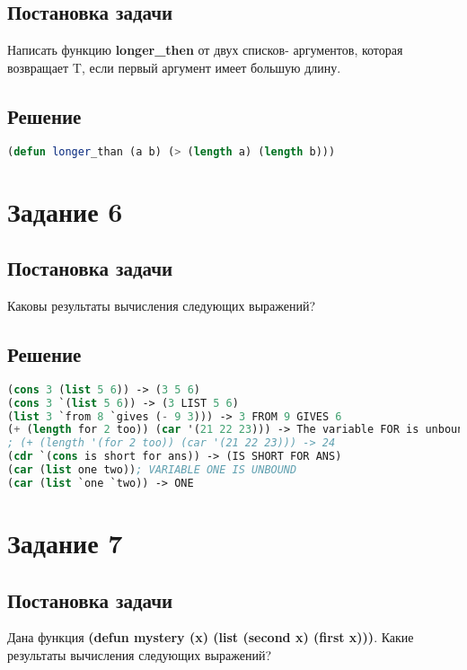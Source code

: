 \subsection*{Постановка задачи}
Написать функцию \textbf{longer\_then} от двух списков- аргументов, которая возвращает T, если первый аргумент имеет большую длину.

\subsection*{Решение}

\begin{lstlisting}[label=5xd,caption=Решение задания №5, language=lisp]
(defun longer_than (a b) (> (length a) (length b)))
\end{lstlisting}

\section*{Задание 6}
\subsection*{Постановка задачи}
Каковы результаты вычисления следующих выражений? 

\subsection*{Решение}

\begin{lstlisting}[label=6xd,caption=Решение задания №6, language=lisp]
(cons 3 (list 5 6)) -> (3 5 6)
(cons 3 `(list 5 6)) -> (3 LIST 5 6)
(list 3 `from 8 `gives (- 9 3))) -> 3 FROM 9 GIVES 6
(+ (length for 2 too)) (car '(21 22 23))) -> The variable FOR is unbound
; (+ (length '(for 2 too)) (car '(21 22 23))) -> 24
(cdr `(cons is short for ans)) -> (IS SHORT FOR ANS)
(car (list one two)); VARIABLE ONE IS UNBOUND
(car (list `one `two)) -> ONE

\end{lstlisting}

\section*{Задание 7}
\subsection*{Постановка задачи}
Дана функция \textbf{(defun mystery (x) (list (second x) (first x)))}. Какие результаты вычисления следующих выражений?

